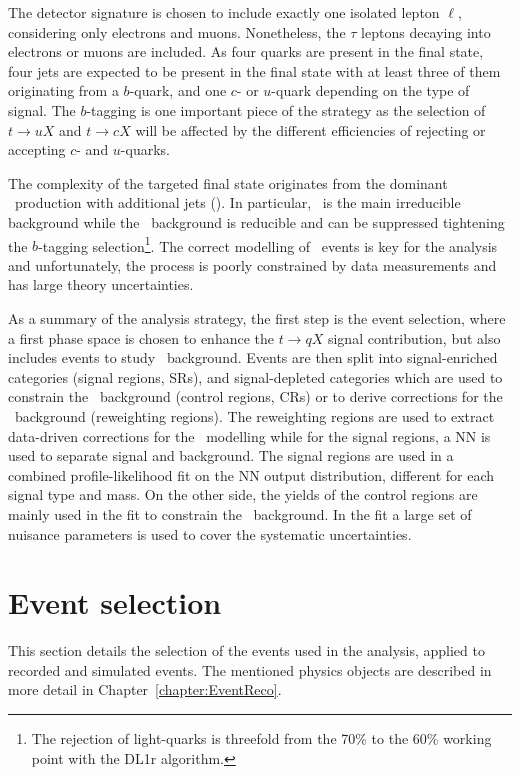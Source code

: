 The detector signature is chosen to include exactly one isolated lepton $\ell$, considering only electrons and muons. Nonetheless, the $\tau$ leptons decaying into electrons or muons are included. As four quarks are present in the final state, four jets are expected to be present in the final state with at least three of them originating from a $b$-quark, and one $c$- or $u$-quark depending on the type of signal. The $b$-tagging is one important piece of the strategy as the selection of $t\to uX$ and $t\to cX$ will be affected by the different efficiencies of rejecting or accepting $c$- and $u$-quarks.

The  complexity of the targeted final state originates from the dominant \ttbar\ production with additional jets (\ttjets). In particular, \ttb\ is the main irreducible background while the \ttl\ background is reducible and can be suppressed tightening the $b$-tagging selection\footnote{The rejection of light-quarks is threefold from the 70\% to the 60\% working point with the DL1r algorithm.}. The correct modelling of \ttbar\ events is key for the analysis and unfortunately, the process is poorly constrained by data measurements and has large theory uncertainties.

As a summary of the analysis strategy, the first step is the event selection, where a first phase space is chosen to enhance the $t\to qX$ signal contribution, but also includes events to study \ttjets\ background. Events are then split into signal-enriched categories (signal regions, SRs), and signal-depleted categories which are used to constrain the \ttb\ background (control regions, CRs) or to derive corrections for the \ttjets\ background (reweighting regions). The reweighting regions are used to extract data-driven corrections for the \ttbar\ modelling while for the signal regions, a NN is used to separate signal and background. The signal regions are used in a combined profile-likelihood fit on the NN output distribution, different for each signal type and mass. On the other side, the yields of the control regions are mainly used in the fit to constrain the \ttb\ background. In the fit a large set of nuisance parameters is used to cover the systematic uncertainties.

\section{Event selection}
\label{tqX:SectionEventSelection}
This section details the selection of the events used in the analysis, applied to recorded and simulated events. The mentioned physics objects are described in more detail in Chapter~\ref{chapter:EventReco}.

